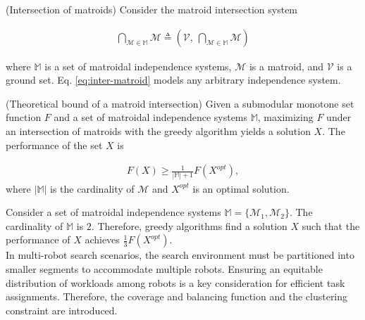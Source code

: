 \begin{theorem} \label{thm:intersection-matroid} (Intersection of matroids) \cite{nemhauser1978analysis}
Consider the matroid intersection system

\begin{align} \label{eq:inter-matroid}
    \bigcap_{\mathcal{M}\in \mathit{\mathbb{M}}} \mathcal{M} \triangleq\left ( \mathcal{V},\ \bigcap_{\mathcal{M}\in \mathit{\mathbb{M}}} \mathcal{M} \right )
\end{align}

where $\mathit{\mathbb{M}}$ is a set of matroidal independence systems, $\mathcal{M}$ is a matroid, and $\mathcal{V}$ is a ground set. Eq. \eqref{eq:inter-matroid} models any arbitrary independence system. \\
\end{theorem}

\begin{theorem} \label{thm:intersection-matroid-bound} (Theoretical bound of a matroid intersection) \cite{fisher1978analysis}
Given a submodular monotone set function $F$ and a set of matroidal independence systems $\mathit{\mathbb{M}}$, maximizing $F$ under an intersection of matroids with the greedy algorithm yields a solution $X$. The performance of the set $X$ is

\begin{align*} \label{eq:inter-matroid}
    F(X) \geq \frac{1}{|\mathit{\mathbb{M}}|+1} F(X^{opt}),
\end{align*}
where $|\mathit{\mathbb{M}}|$ is the cardinality of $\mathcal{M}$ and $X^{opt}$ is an optimal solution. \\
\end{theorem}

Consider a set of matroidal independence systems $\mathit{\mathbb{M}} = \{\mathcal{M}_1, \mathcal{M}_2\}$.
The cardinality of $\mathit{\mathbb{M}}$ is $2$.
Therefore, greedy algorithms find a solution $X$ such that the performance of $X$ achieves $\frac{1}{3} F(X^{opt})$.\\

In multi-robot search scenarios, the search environment must be partitioned into smaller segments to accommodate multiple robots.
Ensuring an equitable distribution of workloads among robots is a key consideration for efficient task assignments.
Therefore, the coverage and balancing function \cite{li2024mrsis} and the clustering constraint \cite{liu2013entropy} are introduced. \\


